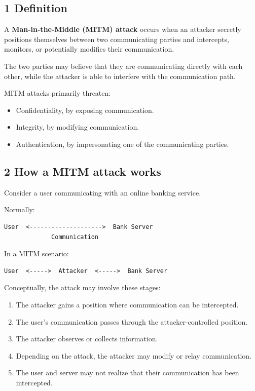 \subsection{1 Definition}

A \textbf{Man-in-the-Middle (MITM) attack} occurs when an attacker secretly positions themselves between two communicating parties and intercepts, monitors, or potentially modifies their communication.

The two parties may believe that they are communicating directly with each other, while the attacker is able to interfere with the communication path.

MITM attacks primarily threaten:

\begin{itemize}
\item Confidentiality, by exposing communication.
\item Integrity, by modifying communication.
\item Authentication, by impersonating one of the communicating parties.
\end{itemize}

\subsection{2 How a MITM attack works}

Consider a user communicating with an online banking service.

Normally:

\begin{lstlisting}
User  <-------------------->  Bank Server
             Communication
\end{lstlisting}

In a MITM scenario:

\begin{lstlisting}
User  <----->  Attacker  <----->  Bank Server
\end{lstlisting}

Conceptually, the attack may involve these stages:

\begin{enumerate}
\item The attacker gains a position where communication can be intercepted.
\item The user's communication passes through the attacker-controlled position.
\item The attacker observes or collects information.
\item Depending on the attack, the attacker may modify or relay communication.
\item The user and server may not realize that their communication has been intercepted.
\end{enumerate}

